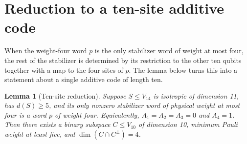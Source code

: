 \documentclass[11pt]{article}
\newtheorem{lemma}[theorem]{Lemma}
\begin{document}
\section{Reduction to a ten-site additive code}\label{reduction-to-a-ten-site-additive-code}

When the weight-four word \(p\) is the only stabilizer word of weight at most four, the rest of the stabilizer is determined by its restriction to the other ten qubits together with a map to the four sites of \(p\). The lemma below turns this into a statement about a single additive code of length ten.

\begin{lemma}[Ten-site reduction]\label{lem:ten-site}
Suppose \(S\leq V_{14}\) is isotropic of dimension 11, has \(d(S)\geq5\), and its only nonzero stabilizer word of physical weight at most four is a word \(p\) of weight four. Equivalently, \(A_1=A_2=A_3=0\) and \(A_4=1\). Then there exists a binary subspace \(C\leq V_{10}\) of dimension 10, minimum Pauli weight at least five, and \(\dim(C\cap C^\perp)=4\).
\end{lemma}
\end{document}
